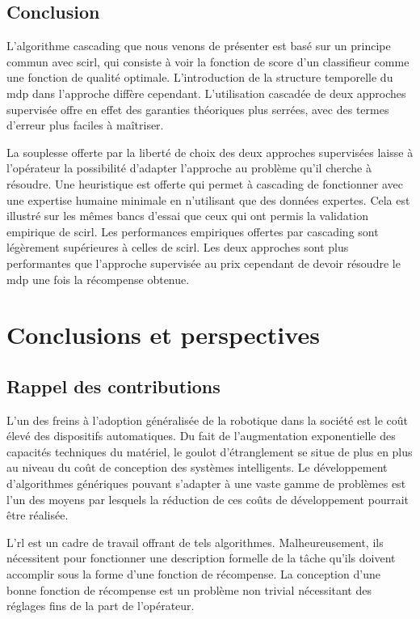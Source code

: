 \documentclass[frenchb,a4paper,justified,notoc]{tufte-book}
\begin{document}
\section{Conclusion}
\label{sec-6-4}


   L'algorithme \gls{cascading} que nous venons de présenter est basé sur un principe commun avec \gls{scirl}, qui consiste à voir la fonction de score d'un classifieur comme une fonction de qualité optimale. L'introduction de la structure temporelle du \gls{mdp} dans l'approche diffère cependant. L'utilisation cascadée de deux approches supervisée offre en effet des garanties théoriques plus serrées, avec des termes d'erreur plus faciles à maîtriser.

   La souplesse offerte par la liberté de choix des deux approches supervisées laisse à l'opérateur la possibilité d'adapter l'approche au problème qu'il cherche à résoudre. Une heuristique est offerte qui permet à \gls{cascading} de fonctionner avec une expertise humaine minimale en n'utilisant que des données expertes. Cela est illustré sur les mêmes bancs d'essai que ceux qui ont permis la validation empirique de \gls{scirl}. Les performances empiriques offertes par \gls{cascading} sont légèrement supérieures à celles de \gls{scirl}. Les deux approches sont plus performantes que l'approche supervisée au prix cependant de devoir résoudre le \gls{mdp} une fois la récompense obtenue.
\chapter{Conclusions et perspectives}
\label{sec-7}
\label{hier-conclusion}
\section{Rappel des contributions}
\label{sec-7-1}

L'un des freins à l'adoption généralisée de la robotique dans la société est le coût élevé des dispositifs automatiques. Du fait de l'augmentation exponentielle des capacités techniques du matériel, le goulot d'étranglement se situe de plus en plus au niveau du coût de conception des systèmes intelligents. Le développement d'algorithmes génériques pouvant s'adapter à une vaste gamme de problèmes est l'un des moyens par lesquels la réduction de ces coûts de développement pourrait être réalisée.

L'\gls{rl} est un cadre de travail offrant de tels algorithmes. Malheureusement, ils nécessitent pour fonctionner une description formelle de la tâche qu'ils doivent accomplir sous la forme d'une fonction de récompense. La conception d'une bonne fonction de récompense est un problème non trivial nécessitant des réglages fins de la part de l'opérateur.
\end{document}
